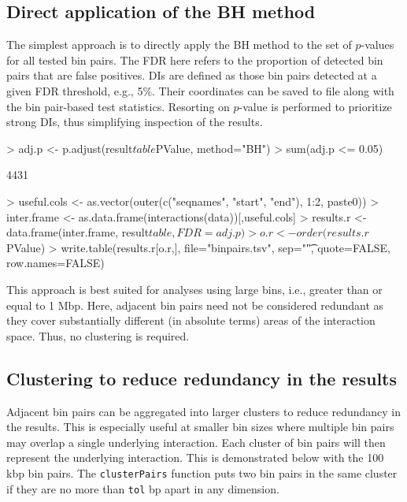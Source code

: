 \documentclass[12pt]{report}
\renewenvironment{Schunk}{\vspace{0pt}}{\vspace{0pt}}
\newcommand{\code}[1]{{\small\texttt{#1}}}
\begin{document}
\subsection{Direct application of the BH method}
The simplest approach is to directly apply the BH method to the set of $p$-values for all tested bin pairs.
The FDR here refers to the proportion of detected bin pairs that are false positives.
DIs are defined as those bin pairs detected at a given FDR threshold, e.g., 5\%.
Their coordinates can be saved to file along with the bin pair-based test statistics.
Resorting on $p$-value is performed to prioritize strong DIs, thus simplifying inspection of the results.

\begin{Schunk}
\begin{Sinput}
> adj.p <- p.adjust(result$table$PValue, method="BH")
> sum(adj.p <= 0.05)
\end{Sinput}
\begin{Soutput}
[1] 4431
\end{Soutput}
\begin{Sinput}
> useful.cols <- as.vector(outer(c("seqnames", "start", "end"), 1:2, paste0))
> inter.frame <- as.data.frame(interactions(data))[,useful.cols]
> results.r <- data.frame(inter.frame, result$table, FDR=adj.p)
> o.r <- order(results.r$PValue)
> write.table(results.r[o.r,], file="binpairs.tsv", sep="\t", quote=FALSE, row.names=FALSE)
\end{Sinput}
\end{Schunk}

This approach is best suited for analyses using large bins, i.e., greater than or equal to 1 Mbp.
Here, adjacent bin pairs need not be considered redundant as they cover substantially different (in absolute terms) areas of the interaction space.
Thus, no clustering is required.

\subsection{Clustering to reduce redundancy in the results}
Adjacent bin pairs can be aggregated into larger clusters to reduce redundancy in the results.
This is especially useful at smaller bin sizes where multiple bin pairs may overlap a single underlying interaction.
Each cluster of bin pairs will then represent the underlying interaction.
This is demonstrated below with the 100 kbp bin pairs.
The \code{clusterPairs} function puts two bin pairs in the same cluster if they are no more than \code{tol} bp apart in any dimension.
\end{document}
